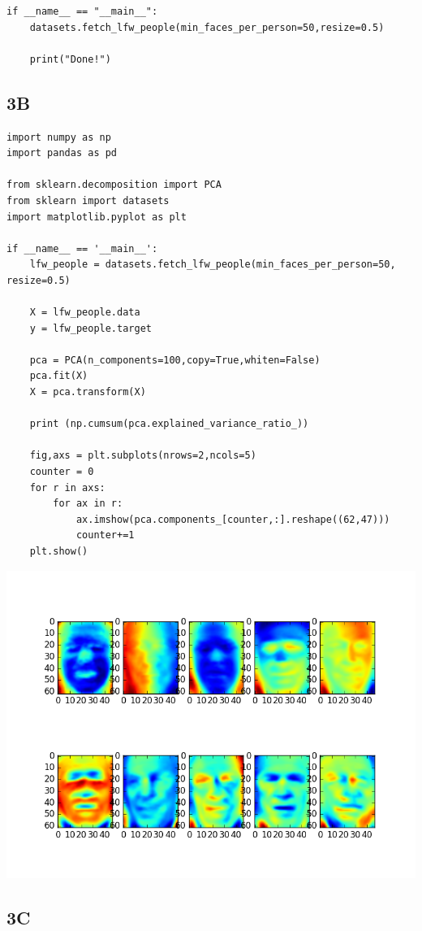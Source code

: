 \documentclass[12pt]{article}
\begin{document}
\begin{flushleft}
\begin{lstlisting}
if __name__ == "__main__":
	datasets.fetch_lfw_people(min_faces_per_person=50,resize=0.5)
	
	print("Done!")

			\end{lstlisting}
		
		\subsection*{3B}
		
			\begin{lstlisting}
import numpy as np 
import pandas as pd

from sklearn.decomposition import PCA
from sklearn import datasets
import matplotlib.pyplot as plt

if __name__ == '__main__':
	lfw_people = datasets.fetch_lfw_people(min_faces_per_person=50, resize=0.5)
	
	X = lfw_people.data
	y = lfw_people.target
	
	pca = PCA(n_components=100,copy=True,whiten=False)
	pca.fit(X)
	X = pca.transform(X)
	
	print (np.cumsum(pca.explained_variance_ratio_))
	
	fig,axs = plt.subplots(nrows=2,ncols=5)
	counter = 0
	for r in axs:
		for ax in r:
			ax.imshow(pca.components_[counter,:].reshape((62,47)))
			counter+=1
	plt.show()
			\end{lstlisting}
			
			\includegraphics[scale=0.5]{HW3_3B.png}
			\label{fig:graph 3B}
		
		\subsection*{3C}
		

\end{flushleft}
\end{document}
